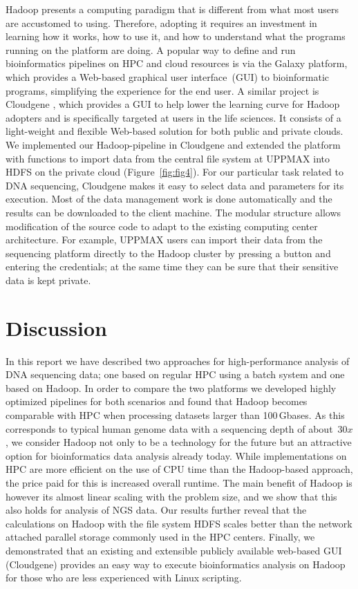 \documentclass{bioinfo}
\begin{document}
Hadoop presents a computing paradigm that is different from what most users are
accustomed to using.  Therefore, adopting it requires an investment in learning
how it works, how to use it, and how to understand what the programs running on
the platform are doing.
A popular way to define and run bioinformatics pipelines on HPC and cloud resources
is via the Galaxy\citep{galaxy,Afgan:2010uq} platform, which provides a Web-based graphical
user interface~(GUI) to bioinformatic programs, simplifying the experience for
the end user.
A similar project is Cloudgene \citep{cloudgene}, which provides a GUI to help lower the learning curve
for Hadoop adopters and is specifically targeted at users in the life
sciences. It consists of a light-weight and flexible Web-based solution for both
public and private clouds. We implemented our Hadoop-pipeline in Cloudgene and
extended the platform with functions to import data from the central file system
at UPPMAX into HDFS on the private cloud (Figure~\ref{fig:fig4}).  For our
particular task related to DNA sequencing, Cloudgene makes it easy to select
data and parameters for its execution. Most of the data management work is done
automatically and the results can be downloaded to the client machine. The
modular structure allows modification of the source code to adapt to the
existing computing center architecture. For example, UPPMAX users can import
their data from the sequencing platform directly to the Hadoop cluster by
pressing a button and entering the credentials; at the same time they can be
sure that their sensitive data is kept private.


\section{Discussion}

In this report we have described two approaches for high-performance analysis of
DNA sequencing data; one based on regular HPC using a batch system and one based
on Hadoop. In order to compare the two platforms we developed highly optimized pipelines
for both scenarios and found that Hadoop becomes comparable with HPC when processing
datasets larger than 100\,Gbases. As this corresponds to typical human genome data with a sequencing depth of about~$30x$, we consider Hadoop not only to be a technology for the future but an attractive option for bioinformatics data analysis already today. While implementations on HPC are more efficient on the use of CPU time than the Hadoop-based approach, the price paid for this is increased overall runtime.
The main benefit of Hadoop is however its almost linear scaling with the problem size, and we show that this also holds for analysis of NGS data.
Our results further reveal that the calculations on Hadoop with the file system HDFS scales
better than the network attached parallel storage commonly used in the HPC centers.  
Finally, we demonstrated that an existing and extensible
publicly available web-based GUI (Cloudgene) provides an easy way to execute
bioinformatics analysis on Hadoop for those who are less experienced with Linux
scripting.
\end{document}

